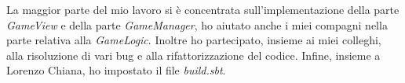 La maggior parte del mio lavoro si è concentrata sull'implementazione della parte \textit{GameView} e della parte \textit{GameManager}, ho aiutato anche i miei compagni nella parte relativa alla \textit{GameLogic}. Inoltre ho partecipato, insieme ai miei colleghi, alla risoluzione di vari bug e alla rifattorizzazione del codice.
Infine, insieme a Lorenzo Chiana, ho impostato il file \textit{build.sbt}.

